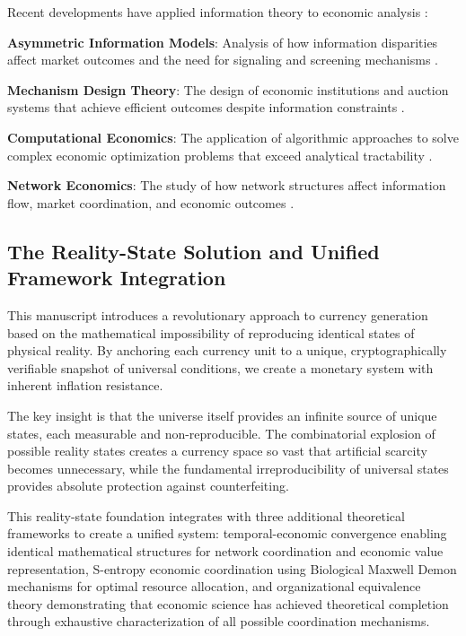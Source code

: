 \documentclass[12pt,a4paper]{article}
\begin{document}
Recent developments have applied information theory to economic analysis \cite{shannon1948,cover1991}:

\textbf{Asymmetric Information Models}: Analysis of how information disparities affect market outcomes and the need for signaling and screening mechanisms \cite{akerlof1970,stiglitz2000}.

\textbf{Mechanism Design Theory}: The design of economic institutions and auction systems that achieve efficient outcomes despite information constraints \cite{myerson1991}.

\textbf{Computational Economics}: The application of algorithmic approaches to solve complex economic optimization problems that exceed analytical tractability \cite{holland1992}.

\textbf{Network Economics}: The study of how network structures affect information flow, market coordination, and economic outcomes \cite{jackson2008,acemoglu2012}.

\subsection{The Reality-State Solution and Unified Framework Integration}

This manuscript introduces a revolutionary approach to currency generation based on the mathematical impossibility of reproducing identical states of physical reality. By anchoring each currency unit to a unique, cryptographically verifiable snapshot of universal conditions, we create a monetary system with inherent inflation resistance.

The key insight is that the universe itself provides an infinite source of unique states, each measurable and non-reproducible. The combinatorial explosion of possible reality states creates a currency space so vast that artificial scarcity becomes unnecessary, while the fundamental irreproducibility of universal states provides absolute protection against counterfeiting.

This reality-state foundation integrates with three additional theoretical frameworks to create a unified system: temporal-economic convergence enabling identical mathematical structures for network coordination and economic value representation, S-entropy economic coordination using Biological Maxwell Demon mechanisms for optimal resource allocation, and organizational equivalence theory demonstrating that economic science has achieved theoretical completion through exhaustive characterization of all possible coordination mechanisms.
\end{document}
